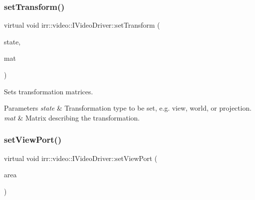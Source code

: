 \subsubsection{\texorpdfstring{set\+Transform()}{setTransform()}\hspace{0.1cm}{\footnotesize\ttfamily [2/2]}}
{\footnotesize\ttfamily virtual void irr\+::video\+::\+I\+Video\+Driver\+::set\+Transform (\begin{DoxyParamCaption}\item[{\hyperlink{namespaceirr_1_1video_a15b57657a320243be03ae6f66fcff43d}{E\+\_\+\+T\+R\+A\+N\+S\+F\+O\+R\+M\+A\+T\+I\+O\+N\+\_\+\+S\+T\+A\+TE}}]{state,  }\item[{const \hyperlink{namespaceirr_1_1core_a4c9d4e29899535971052810954a14431}{core\+::matrix4} \&}]{mat }\end{DoxyParamCaption})\hspace{0.3cm}{\ttfamily [pure virtual]}}



Sets transformation matrices. 


\begin{DoxyParams}{Parameters}
{\em state} & Transformation type to be set, e.\+g. view, world, or projection. \\
\hline
{\em mat} & Matrix describing the transformation. \\
\hline
\end{DoxyParams}
\mbox{\label{classirr_1_1video_1_1IVideoDriver_af03cf9b67bb7b43a8021bbe4baa78a08}} 
\subsubsection{\texorpdfstring{set\+View\+Port()}{setViewPort()}\hspace{0.1cm}{\footnotesize\ttfamily [1/2]}}
{\footnotesize\ttfamily virtual void irr\+::video\+::\+I\+Video\+Driver\+::set\+View\+Port (\begin{DoxyParamCaption}\item[{const \hyperlink{classirr_1_1core_1_1rect}{core\+::rect}$<$ \hyperlink{namespaceirr_ac66849b7a6ed16e30ebede579f9b47c6}{s32} $>$ \&}]{area }\end{DoxyParamCaption})\hspace{0.3cm}{\ttfamily [pure virtual]}}



